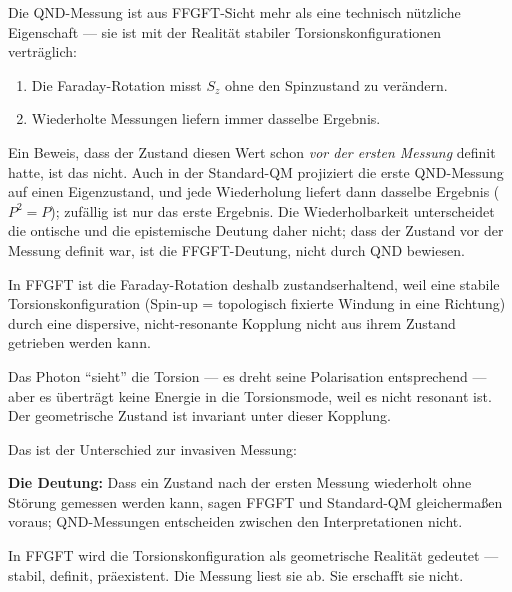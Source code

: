 Die QND-Messung ist aus FFGFT-Sicht mehr
als eine technisch nützliche Eigenschaft ---
sie ist mit der Realität stabiler Torsionskonfigurationen
verträglich:

\begin{enumerate}
  \item Die Faraday-Rotation misst $S_z$ ohne den
    Spinzustand zu verändern.
  \item Wiederholte Messungen liefern immer dasselbe Ergebnis.
\end{enumerate}

Ein Beweis, dass der Zustand diesen Wert schon
\emph{vor der ersten Messung} definit hatte, ist das nicht.
Auch in der Standard-QM projiziert die erste QND-Messung
auf einen Eigenzustand, und jede Wiederholung liefert dann
dasselbe Ergebnis ($P^2 = P$); zufällig ist nur das erste Ergebnis.
Die Wiederholbarkeit unterscheidet die ontische und die
epistemische Deutung daher nicht; dass der Zustand vor der
Messung definit war, ist die FFGFT-Deutung, nicht durch QND bewiesen.

\begin{foundation}
In FFGFT ist die Faraday-Rotation deshalb zustandserhaltend,
weil eine stabile Torsionskonfiguration
(Spin-up = topologisch fixierte Windung in eine Richtung)
durch eine dispersive, nicht-resonante Kopplung
nicht aus ihrem Zustand getrieben werden kann.

Das Photon ``sieht'' die Torsion --- es dreht seine
Polarisation entsprechend --- aber es überträgt keine
Energie in die Torsionsmode, weil es nicht resonant ist.
Der geometrische Zustand ist invariant unter dieser Kopplung.

Das ist der Unterschied zur invasiven Messung:
\begin{center}
\end{center}

\textbf{Die Deutung:}
Dass ein Zustand nach der ersten Messung wiederholt ohne
Störung gemessen werden kann, sagen FFGFT und Standard-QM
gleichermaßen voraus; QND-Messungen entscheiden zwischen
den Interpretationen nicht.

In FFGFT wird die Torsionskonfiguration als
geometrische Realität gedeutet --- stabil, definit, präexistent.
Die Messung liest sie ab. Sie erschafft sie nicht.
\end{foundation}

